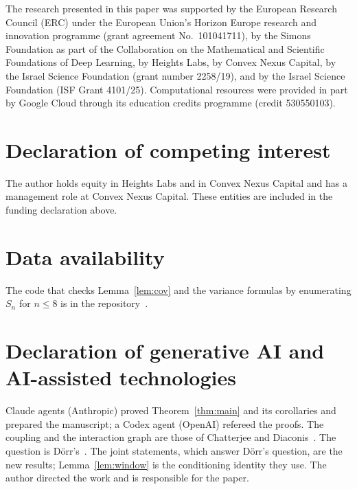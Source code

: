 \documentclass[11pt]{amsart}
\theoremstyle{remark}
\begin{document}
The research presented in this paper was supported by the European Research Council (ERC) under the European Union's
Horizon Europe research and innovation programme (grant agreement No.~101041711), by the Simons Foundation as part of
the Collaboration on the Mathematical and Scientific Foundations of Deep Learning, by Heights Labs, by Convex Nexus
Capital, by the Israel Science Foundation (grant number 2258/19), and by the Israel Science Foundation (ISF Grant
4101/25). Computational resources were provided in part by Google Cloud through its education credits programme
(credit 530550103).

\section*{Declaration of competing interest}
The author holds equity in Heights Labs and in Convex Nexus Capital and has a management role at Convex Nexus Capital.
These entities are included in the funding declaration above.

\section*{Data availability}
The code that checks Lemma~\ref{lem:cov} and the variance formulas by enumerating $S_n$ for $n\le8$ is in the
repository~\cite{Repo}.

\section*{Declaration of generative AI and AI-assisted technologies}
Claude agents (Anthropic) proved Theorem~\ref{thm:main} and its corollaries and prepared the manuscript; a Codex agent
(OpenAI) refereed the proofs. The coupling and the interaction graph are those of Chatterjee and Diaconis~\cite{CD}. The
question is Dörr's~\cite{Dorr}. The joint statements, which answer Dörr's question, are the new results; Lemma~\ref{lem:window} is the conditioning
identity they use. The author
directed the work and is responsible for the paper.
\end{document}
